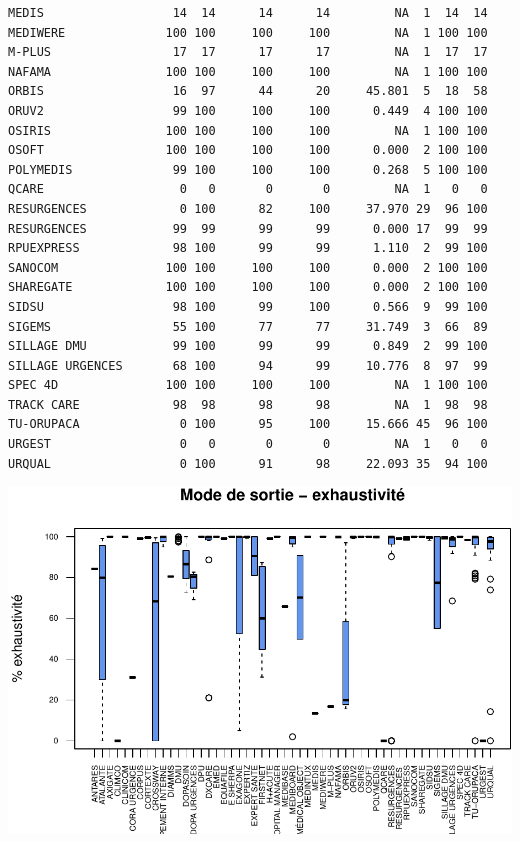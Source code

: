 \documentclass[]{article}
\begin{document}
\begin{verbatim}
MEDIS                  14  14      14      14         NA  1  14  14
MEDIWERE              100 100     100     100         NA  1 100 100
M-PLUS                 17  17      17      17         NA  1  17  17
NAFAMA                100 100     100     100         NA  1 100 100
ORBIS                  16  97      44      20     45.801  5  18  58
ORUV2                  99 100     100     100      0.449  4 100 100
OSIRIS                100 100     100     100         NA  1 100 100
OSOFT                 100 100     100     100      0.000  2 100 100
POLYMEDIS              99 100     100     100      0.268  5 100 100
QCARE                   0   0       0       0         NA  1   0   0
RESURGENCES             0 100      82     100     37.970 29  96 100
RESURGENCES            99  99      99      99      0.000 17  99  99
RPUEXPRESS             98 100      99      99      1.110  2  99 100
SANOCOM               100 100     100     100      0.000  2 100 100
SHAREGATE             100 100     100     100      0.000  2 100 100
SIDSU                  98 100      99     100      0.566  9  99 100
SIGEMS                 55 100      77      77     31.749  3  66  89
SILLAGE DMU            99 100      99      99      0.849  2  99 100
SILLAGE URGENCES       68 100      94      99     10.776  8  97  99
SPEC 4D               100 100     100     100         NA  1 100 100
TRACK CARE             98  98      98      98         NA  1  98  98
TU-ORUPACA              0 100      95     100     15.666 45  96 100
URGEST                  0   0       0       0         NA  1   0   0
URQUAL                  0 100      91      98     22.093 35  94 100
\end{verbatim}

\includegraphics{septembre2015_files/figure-latex/unnamed-chunk-28-1.pdf}
\end{document}
